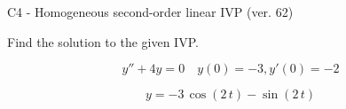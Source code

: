 \begin{exercise}
  \begin{exerciseTitle}C4 - Homogeneous second-order linear IVP (ver. 62)\end{exerciseTitle}
  \begin{exerciseStatement}
    
Find the solution to the given IVP.

    
\[y''+4y = 0 \hspace{1em} y(0) = -3 , y'(0) = -2\]

  \end{exerciseStatement}
  \begin{exerciseAnswer}
    
\[y= -3 \, \cos\left(2 \, t\right) - \sin\left(2 \, t\right)\]

  \end{exerciseAnswer}
\end{exercise}